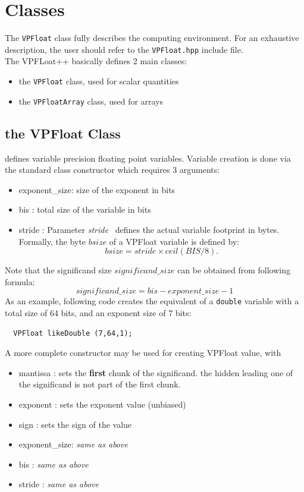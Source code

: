 \documentclass[11pt]{report}
\begin{document}
\section{Classes}
The \texttt{VPFloat} class fully describes the computing environment.
For an exhaustive description, the user should refer to the \texttt{VPFloat.hpp} include file.\\
The VPFLoat++ basically defines 2 main classes:
\begin{itemize}
\item the \texttt{VPFloat} class, used for scalar quantities
\item the \texttt{VPFloatArray} class, used for arrays
\end{itemize}

\subsection{the VPFloat Class} defines variable precision floating point variables.
Variable creation is done via the standard class constructor which requires 3 arguments:
\begin{itemize}
\item exponent\_size: size of the exponent in bits 
\item bis : total size of the variable in bits
\item stride : 
  Parameter \emph{stride\ } defines the actual variable footprint in bytes. Formally, the byte $bsize$ of a VPFloat variable is defined by:
  \begin{equation}
    bsize = stride \times ceil(BIS/8).
  \end {equation}
\end{itemize}
Note that the significand size $significand\_size$ can be obtained from following formula:
\begin{equation}
  significand\_size = bis - exponent\_size - 1  
\end{equation}
As an example, following code creates the equivalent of a \texttt{double} variable with a total size of 64 bits, and an exponent size of 7 bits:
\begin{verbatim}
  VPFloat likeDouble (7,64,1);
\end{verbatim}

A more complete constructor may be used for creating VPFloat value, with 
\begin{itemize}
\item mantissa : sets the \textbf{first} chunk of the significand. the hidden leading one of the significand is not part of the first chunk.
\item exponent : sets the exponent value (unbiased)
  \item sign : sets the sign of the value
\item exponent\_size: \emph{same as above}
\item bis : \emph{same as above}
\item stride : \emph{same as above}

\end{itemize}
\end{document}
